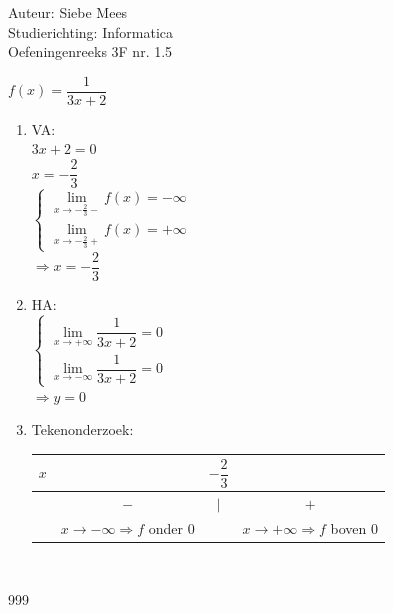 \documentclass[a4paper]{article}
\begin{document}
  
\noindent \large Auteur: Siebe Mees \\
\noindent \large Studierichting: Informatica\\
\noindent \large Oefeningenreeks 3F nr. 1.5\\

\medskip

\normalsize

$f(x)=\dfrac{1}{3x+2}$\\

\begin{enumerate}
\item VA:\\

$3x+2=0$\\

$x=-\dfrac{2}{3}$\\

$ \left \{
\begin{array}{l}
\lim\limits_{x \rightarrow -\tfrac{2}{3}-} f(x)=-\infty \\

\lim\limits_{x \rightarrow -\tfrac{2}{3}+} f(x)=+\infty
\end{array}
\right .$\\

$\Rightarrow x=-\dfrac{2}{3}$\\


\item HA:\\

$ \left \{
\begin{array}{l}
\lim\limits_{x \rightarrow +\infty} \dfrac{1}{3x+2}=0 \\

\lim\limits_{x \rightarrow -\infty} \dfrac{1}{3x+2}=0
\end{array}
\right .$\\

$\Rightarrow y=0$\\


\item Tekenonderzoek:\\

\begin{tabular}{c|ccc}
$x$ &  & $-\dfrac{2}{3}$ &  \\ \hline

$ $ & $-$ & $|$ & $+$ \\

$ $ & $x \rightarrow -\infty \Rightarrow f$ onder 0 & & $x \rightarrow +\infty \Rightarrow f$ boven 0$$ \\

\end{tabular}\\

\end{enumerate}


\begin{thebibliography}{999}
\end{thebibliography}
\end{document}
